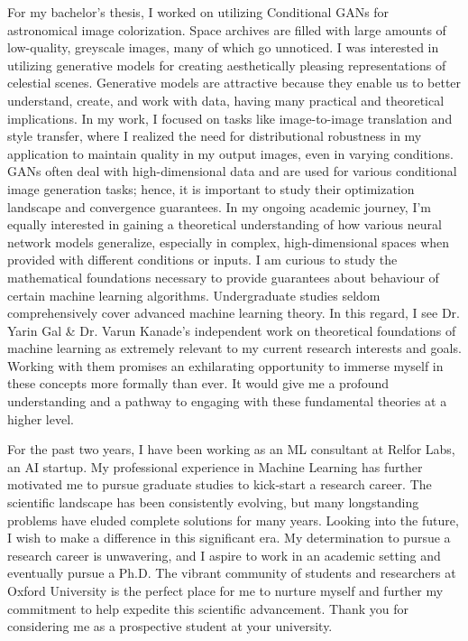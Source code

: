 \documentclass{article}
\begin{document}
  \vspace{5pt}
\hspace{0.25in}For my bachelor’s thesis, I worked on utilizing Conditional GANs
for astronomical image colorization. Space archives are filled with large
amounts of low-quality, greyscale images, many of which go unnoticed. I was
interested in utilizing generative models for creating aesthetically pleasing
representations of celestial scenes. Generative models are attractive because
they enable us to better understand, create, and work with data, having many
practical and theoretical implications. In my work, I focused on tasks like
image-to-image translation and style transfer, where I realized the need for
distributional robustness in my application to maintain quality in my output
images, even in varying conditions. GANs often deal with high-dimensional data
and are used for various conditional image generation tasks; hence, it is
important to study their optimization landscape and convergence guarantees. In
my ongoing academic journey, I’m equally interested in gaining a theoretical
understanding of how various neural network models generalize, especially in
complex, high-dimensional spaces when provided with different conditions or
inputs. I am curious to study the mathematical foundations necessary to provide
guarantees about behaviour of certain machine learning algorithms. Undergraduate
studies seldom comprehensively cover advanced machine learning theory. In this
regard, I see Dr. Yarin Gal \& Dr. Varun Kanade’s independent work on theoretical
foundations of machine learning as extremely relevant to my current research
interests and goals. Working with them promises an exhilarating opportunity to
immerse myself in these concepts more formally than ever. It would give me a
profound understanding and a pathway to engaging with these fundamental theories
at a higher level.

  \vspace{5pt}
\hspace{0.25in}For the past two years, I have been working as an ML consultant
at Relfor Labs, an AI startup. My professional experience in Machine Learning
has further motivated me to pursue graduate studies to kick-start a research
career. The scientific landscape has been consistently evolving, but many
longstanding problems have eluded complete solutions for many years. Looking
into the future, I wish to make a difference in this significant era. My
determination to pursue a research career is unwavering, and I aspire to work in
an academic setting and eventually pursue a Ph.D. The vibrant community of
students and researchers at Oxford University is the perfect place for me to
nurture myself and further my commitment to help expedite this scientific
advancement. Thank you for considering me as a prospective student at your
university.
\end{document}
